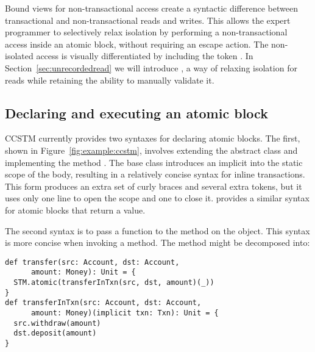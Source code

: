 Bound views for non-transactional access create a syntactic difference
between transactional and non-transactional reads and writes.
This allows the expert programmer to selectively relax isolation by
performing a non-transactional access inside an atomic block, without
requiring an escape action.  The non-isolated access
is visually differentiated by including the token .  In
Section~\ref{sec:unrecordedread} we will introduce ,
a way of relaxing isolation for reads while retaining the ability to
manually validate it.

\subsection{Declaring and executing an atomic block}

CCSTM currently provides two syntaxes for declaring atomic blocks.  The first,
shown in Figure~\ref{fig:example:ccstm}, involves extending the
abstract class  and implementing the method .  The base class introduces an implicit  into the
static scope of the body, resulting in a relatively concise syntax for
inline transactions.  This form produces an extra set of curly braces
and several extra tokens, but it uses only one line to open the scope
and one to close it.   provides a similar syntax
for atomic blocks that return a value.

The second syntax is to pass a function \code{~=>~}
to the  method on the  object.  This syntax is more
concise when invoking a method.  The  method
might be decomposed into:
\lstset{numbers=none}
\begin{lstlisting}
def transfer(src: Account, dst: Account,
      amount: Money): Unit = {
  STM.atomic(transferInTxn(src, dst, amount)(_))
}
def transferInTxn(src: Account, dst: Account,
      amount: Money)(implicit txn: Txn): Unit = {
  src.withdraw(amount)
  dst.deposit(amount)
}
\end{lstlisting}
\lstset{numbers=left}

